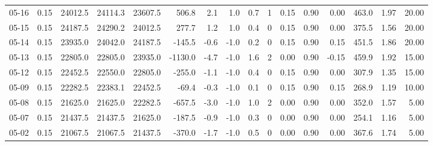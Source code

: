 \begin{threeparttable}
{\begin{tabular}{lrrrrrrrrrrrrrrr}
  05-16 &     0.15 & 24012.5 & 24114.3 & 23607.5 &      506.8 &            2.1 &                      1.0 &                 0.7 &              1 &       0.15 &      0.90 &           0.00 &            463.0 &            1.97 &                  20.00 \\
  05-15 &     0.15 & 24187.5 & 24290.2 & 24012.5 &      277.7 &            1.2 &                      1.0 &                 0.4 &              0 &       0.15 &      0.90 &           0.00 &            375.5 &            1.56 &                  20.00 \\
  05-14 &     0.15 & 23935.0 & 24042.0 & 24187.5 &     -145.5 &           -0.6 &                     -1.0 &                 0.2 &              0 &       0.15 &      0.90 &           0.15 &            451.5 &            1.86 &                  20.00 \\
  05-13 &     0.15 & 22805.0 & 22805.0 & 23935.0 &    -1130.0 &           -4.7 &                     -1.0 &                 1.6 &              2 &       0.00 &      0.90 &          -0.15 &            459.9 &            1.92 &                  15.00 \\
  05-12 &     0.15 & 22452.5 & 22550.0 & 22805.0 &     -255.0 &           -1.1 &                     -1.0 &                 0.4 &              0 &       0.15 &      0.90 &           0.00 &            307.9 &            1.35 &                  15.00 \\
  05-09 &     0.15 & 22282.5 & 22383.1 & 22452.5 &      -69.4 &           -0.3 &                     -1.0 &                 0.1 &              0 &       0.15 &      0.90 &           0.15 &            268.9 &            1.19 &                  10.00 \\
  05-08 &     0.15 & 21625.0 & 21625.0 & 22282.5 &     -657.5 &           -3.0 &                     -1.0 &                 1.0 &              2 &       0.00 &      0.90 &           0.00 &            352.0 &            1.57 &                   5.00 \\
  05-07 &     0.15 & 21437.5 & 21437.5 & 21625.0 &     -187.5 &           -0.9 &                     -1.0 &                 0.3 &              0 &       0.00 &      0.90 &           0.00 &            254.1 &            1.16 &                   5.00 \\
  05-02 &     0.15 & 21067.5 & 21067.5 & 21437.5 &     -370.0 &           -1.7 &                     -1.0 &                 0.5 &              0 &       0.00 &      0.90 &           0.00 &            367.6 &            1.74 &                   5.00 \\

\end{tabular}}
\end{threeparttable}
